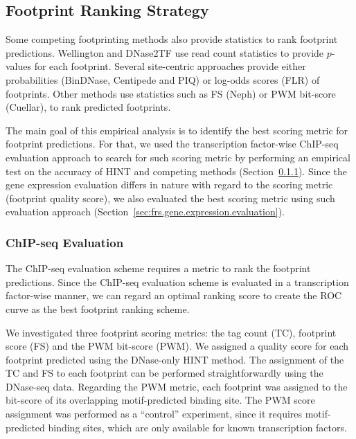 \subsection{Footprint Ranking Strategy}
\label{sec:footprint.ranking.strategy}

Some competing footprinting methods also provide statistics to rank footprint predictions. Wellington and DNase2TF use read count statistics to provide $p$-values for each footprint. Several site-centric approaches provide either probabilities (BinDNase, Centipede and PIQ) or log-odds scores (FLR) of footprints. Other methods use statistics such as FS (Neph) or PWM bit-score (Cuellar), to rank predicted footprints.

The main goal of this empirical analysis is to identify the best scoring metric for footprint predictions. For that, we used the transcription factor-wise ChIP-seq evaluation approach to search for such scoring metric by performing an empirical test on the accuracy of HINT and competing methods (Section~\ref{sec:frs.chipseq.evaluation}). Since the gene expression evaluation differs in nature with regard to the scoring metric (footprint quality score), we also evaluated the best scoring metric using such evaluation approach (Section~\ref{sec:frs.gene.expression.evaluation}).

\subsubsection{ChIP-seq Evaluation}
\label{sec:frs.chipseq.evaluation}

The ChIP-seq evaluation scheme requires a metric to rank the footprint predictions. Since the ChIP-seq evaluation scheme is evaluated in a transcription factor-wise manner, we can regard an optimal ranking score to create the ROC curve as the best footprint ranking scheme.

We investigated three footprint scoring metrics: the tag count (TC), footprint score (FS) and the PWM bit-score (PWM). We assigned a quality score for each footprint predicted using the DNase-only HINT method. The assignment of the TC and FS to each footprint can be performed straightforwardly using the DNase-seq data. Regarding the PWM metric, each footprint was assigned to the bit-score of its overlapping motif-predicted binding site. The PWM score assignment was performed as a ``control'' experiment, since it requires motif-predicted binding sites, which are only available for known transcription factors.

